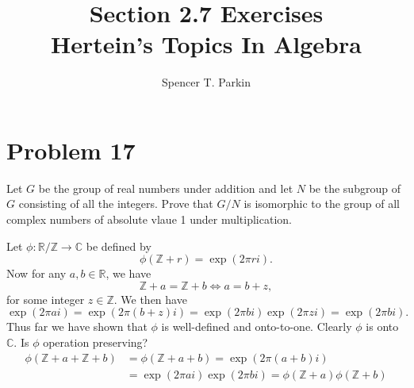 \documentclass[12pt]{article}
\title{Section 2.7 Exercises\\Hertein's Topics In Algebra}
\author{Spencer T. Parkin}
\newcommand{\Z}{\mathbb{Z}}
\newcommand{\R}{\mathbb{R}}
\newcommand{\C}{\mathbb{C}}
\begin{document}
\maketitle

\section*{Problem 17}

Let $G$ be the group of real numbers under addition and let $N$ be the
subgroup of $G$ consisting of all the integers.  Prove that $G/N$ is
isomorphic to the group of all complex numbers of absolute vlaue 1
under multiplication.

Let $\phi:\R/\Z\to\C$ be defined by
\begin{equation*}
\phi(\Z+r) = \exp(2\pi r i).
\end{equation*}
Now for any $a,b\in\R$, we have
\begin{equation*}
\Z+a=\Z+b \iff a=b+z,
\end{equation*}
for some integer $z\in\Z$.  We then have
\begin{equation*}
\exp(2\pi a i) = \exp(2\pi(b+z) i) = \exp(2\pi b i)\exp(2\pi z i) = \exp(2\pi b i).
\end{equation*}
Thus far we have shown that $\phi$ is well-defined and onto-to-one.
Clearly $\phi$ is onto $\C$.  Is $\phi$ operation preserving?
\begin{align*}
 \phi(\Z+a+\Z+b) &=\phi(\Z+a+b) = \exp(2\pi(a+b)i) \\
&=\exp(2\pi a i)\exp(2\pi b i) = \phi(\Z+a)\phi(\Z+b)
\end{align*}
\end{document}
